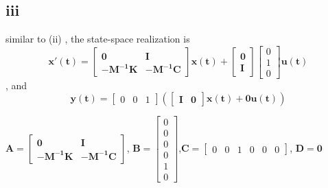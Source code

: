 \documentclass[12pt,a4paper]{article}
\begin{document}
\subsection*{iii}
similar to (ii)
, the state-space realization is
\[
    \mathbf{x'(t)} = \begin{bmatrix}
        \mathbf{0} & \mathbf{I}\\
        \mathbf{-\mathbf{M}^{-1}\mathbf{K}} & \mathbf{-\mathbf{M}^{-1}\mathbf{C}}
    \end{bmatrix}
    \mathbf{x(t)} + \begin{bmatrix}
        \mathbf{0}\\
        \mathbf{I}
    \end{bmatrix}
    \begin{bmatrix}
        0 \\
        1 \\
        0
    \end{bmatrix}
    \mathbf{u(t)}
\]
, and
\[
    \mathbf{y(t)} =
    \begin{bmatrix}
        0 & 0 & 1
    \end{bmatrix}(
    \begin{bmatrix}
        \mathbf{I} & \mathbf{0}
    \end{bmatrix}
    \mathbf{x(t)} + 
    \mathbf{0}\mathbf{u(t)})
\]

$\mathbf{A} = \begin{bmatrix}
    \mathbf{0} & \mathbf{I}\\
    \mathbf{-\mathbf{M}^{-1}\mathbf{K}} & \mathbf{-\mathbf{M}^{-1}\mathbf{C}}
\end{bmatrix}
$, $ \mathbf{B} = \begin{bmatrix}
    0 \\
    0 \\
    0 \\
    0 \\
    1 \\
    0
\end{bmatrix}$,$\mathbf{C}=\begin{bmatrix}
    0 & 0 & 1 & 0 & 0 & 0
\end{bmatrix}$,
$\mathbf{D} = \mathbf{0}$
\end{document}
